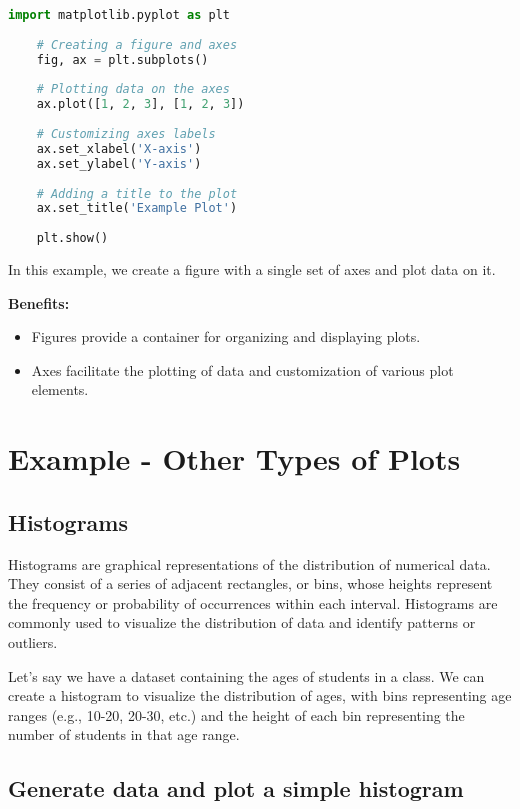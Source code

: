 \begin{lstlisting}[language=Python]
	import matplotlib.pyplot as plt
	
	# Creating a figure and axes
	fig, ax = plt.subplots()
	
	# Plotting data on the axes
	ax.plot([1, 2, 3], [1, 2, 3])
	
	# Customizing axes labels
	ax.set_xlabel('X-axis')
	ax.set_ylabel('Y-axis')
	
	# Adding a title to the plot
	ax.set_title('Example Plot')
	
	plt.show()
\end{lstlisting}

In this example, we create a figure with a single set of axes and plot data on it.

\textbf{Benefits:}
\begin{itemize}
	\item Figures provide a container for organizing and displaying plots.
	\item Axes facilitate the plotting of data and customization of various plot elements.
\end{itemize}

\section{Example - Other Types of Plots}

\subsection{Histograms}

Histograms are graphical representations of the distribution of numerical data. They consist of a series of adjacent rectangles, or bins, whose heights represent the frequency or probability of occurrences within each interval. Histograms are commonly used to visualize the distribution of data and identify patterns or outliers.

Let's say we have a dataset containing the ages of students in a class. We can create a histogram to visualize the distribution of ages, with bins representing age ranges (e.g., 10-20, 20-30, etc.) and the height of each bin representing the number of students in that age range.

\subsection*{Generate data and plot a simple histogram}


